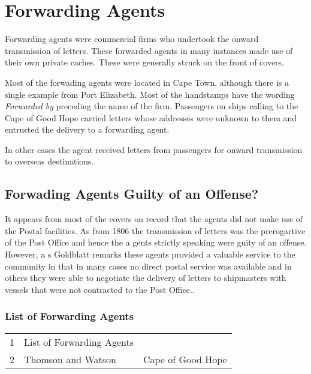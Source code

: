 \chapter{Forwarding Agents}

Forwarding agents were commercial firms who undertook the onward transmission of letters. 
These forwarded agents in many instances made use of their own private caches. 
These were generally struck on the front of covers. 


Most of the forwading agents were located in Cape Town,
although there is a single example from Port Elizabeth. 
Most of the handstamps have the wording \textit{Forwarded by}
preceding the name of the firm. Passengers on ships calling to 
the Cape of Good Hope carried letters whose addresses were unknown 
to them and entrusted the delivery to a forwarding agent.




In other cases the agent received letters from passengers for 
onward transmission to overseas destinations. 

\section{Forwading Agents Guilty of an Offense?}

It appears from most of the covers on record that the agents did 
not make use of the Postal facilities. 
As from 1806 the transmission of letters was the prerogartive of 
the Post Office and hence the a
gents strictly speaking were guity of an offense. However, a
s Goldblatt remarks these agents provided a valuable service 
to the community in that in many cases no direct postal
service was available and in others they were able to negotiate 
the delivery of letters to shipmasters with vessels that were
not contracted to the Post Office..


\subsection{List of Forwarding Agents}
 
\begin{longtable}{lll}
1 & List of Forwarding Agents & \\
2 & Thomson and Watson & Cape of Good Hope\\
\end{longtable}
 
